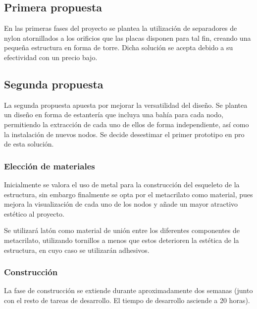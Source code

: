 \subsection{Primera propuesta}

En las primeras fases del proyecto se plantea la utilización de separadores de nylon atornillados a los orificios que las placas disponen para tal fin, creando una pequeña estructura en forma de torre. Dicha solución se acepta debido a su efectividad con un precio bajo.

\subsection{Segunda propuesta}

La segunda propuesta apuesta por mejorar la versatilidad del diseño. Se plantea un diseño en forma de estantería que incluya una bahía para cada nodo, permitiendo la extracción de cada uno de ellos de forma independiente, así como la instalación de nuevos nodos. Se decide desestimar el primer prototipo en pro de esta solución.

\subsubsection{Elección de materiales}

Inicialmente se valora el uso de metal para la construcción del esqueleto de la estructura, sin embargo finalmente se opta por el metacrilato como material, pues mejora la visualización de cada uno de los nodos y añade un mayor atractivo estético al proyecto.

Se utilizará latón como material de unión entre los diferentes componentes de metacrilato, utilizando tornillos a menos que estos deterioren la estética de la estructura, en cuyo caso se utilizarán adhesivos.

\subsubsection{Construcción}

La fase de construcción se extiende durante aproximadamente dos semanas (junto con el resto de tareas de desarrollo. El tiempo de desarrollo asciende a 20 horas).

